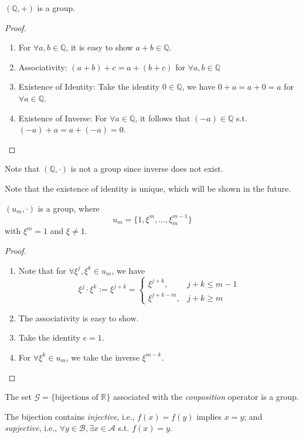 \begin{proposition}
$(\mathbb{Q},+)$ is a group.
\end{proposition}
\begin{proof}
\begin{enumerate}
\item
For $\forall a,b\in\mathbb{Q}$, it is easy to show $a+b\in\mathbb{Q}$.
\item
Associativity: $(a+b)+c=a+(b+c)$ for $\forall a,b\in\mathbb{Q}$
\item
Existence of Identity: Take the identity $0\in\mathbb{Q}$, we have $0+a=a+0=a$ for $\forall a\in\mathbb{Q}$.
\item
Existence of Inverse: For $\forall a\in\mathbb{Q}$, it follows that $(-a)\in\mathbb{Q}$ s.t. $(-a)+a=a+(-a)=0$.
\end{enumerate}
\end{proof}
Note that $(\mathbb{Q},\cdot)$ is not a group since inverse does not exist.
\begin{remark}
Note that the existence of identity is unique, which will be shown in the future.
\end{remark}
\begin{proposition}
$(u_m,\cdot)$ is a group, where
\[
u_m=\{1,\xi^m,\dots,\xi_m^{m-1}\}
\] 
with $\xi^m=1$ and $\xi\ne1$.
\end{proposition}
\begin{proof}
\begin{enumerate}
\item
Note that for $\forall \xi^j,\xi^k\in u_m$, we have
\[
\xi^j\cdot\xi^k:=\xi^{j+k}=\left\{
\begin{aligned}
\xi^{j+k}, &j+k\le m-1\\
\xi^{j+k-m}, &j+k\ge m
\end{aligned}
\right.
\]
\item
The associativity is easy to show.
\item
Take the identity $e=1$.
\item
For $\forall\xi^k\in u_m$, we take the inverse $\xi^{m-k}$.
\end{enumerate}
\end{proof}
\begin{proposition}
The set $\mathcal{G} = \{\mbox{bijections of $\mathbb{R}$}\}$ associated with the \emph{conposition} operator is a group.
\end{proposition}
\begin{definition}[bijection]
The bijection contains \emph{injective}, i.e., $f(x)=f(y)$ implies $x=y$; and \emph{supjective}, i.e., $\forall y\in\mathcal{B}, \exists x\in\mathcal{A}$ s.t. $f(x)=y$.
\end{definition}
